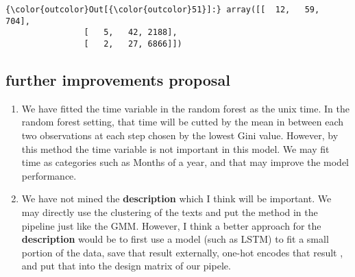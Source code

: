 \documentclass[11pt]{article}
\providecommand{\tightlist}{%
      \setlength{\itemsep}{0pt}\setlength{\parskip}{0pt}}
\begin{document}
\begin{Verbatim}[commandchars=\\\{\}]
{\color{outcolor}Out[{\color{outcolor}51}]:} array([[  12,   59,  704],
                [   5,   42, 2188],
                [   2,   27, 6866]])
\end{Verbatim}
            
    \subsection{further improvements
proposal}\label{further-improvements-proposal}

    \begin{enumerate}
\def\labelenumi{\arabic{enumi}.}
\tightlist
\item
  We have fitted the time variable in the random forest as the unix
  time. In the random forest setting, that time will be cutted by the
  mean in between each two observations at each step chosen by the
  lowest Gini value. However, by this method the time variable is not
  important in this model. We may fit time as categories such as Months
  of a year, and that may improve the model performance.
\item
  We have not mined the \textbf{description} which I think will be
  important. We may directly use the clustering of the texts and put the
  method in the pipeline just like the GMM. However, I think a better
  approach for the \textbf{description} would be to first use a model
  (such as LSTM) to fit a small portion of the data, save that result
  externally, one-hot encodes that result , and put that into the design
  matrix of our pipele.
\end{enumerate}


    
    
    
    
\end{document}
